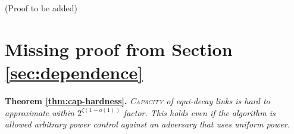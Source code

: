 \documentclass[11pt]{amsart}
\newcommand{\prob}[1]{\textsc{#1}}
\begin{document}
(Proof to be added)
\fi



\iffalse We have proposed a model that captures spatial variability of wireless signals.
The approach is generic enough that most algorithmic techniques for the geometric SINR model carry over with minimal adaptation. 

There are three immediate open questions that our results raise:
Can we further reduce the gap in the approximation in terms of the smoothness parameter? Can we extend our approach to the case, commonly required by distributed algorithms, where we need a \emph{lower} bound on decay and smoothness?
And, can we extend the graph-based approach we applied to connectivity to Steiner-problems or directed graphs?

It is also important to point out that our model does not attempt to cover all the challenging aspects of wireless networks. For one, it is \emph{static} and does not capture dynamicity or temporal variability; this is a very challenging but important aspect. And second, it is \emph{deterministic}; success or failure in wireless networks does have a probabilistic aspect. The work of \cite{Dams2012} suggests that deterministic approximation algorithms perform well if probabilities are independent on a wide scale; the challenge is in modeling the likely dependence, both spatially and temporally. Handling these issues is an interesting and challenging open research direction. 
\fi

\newpage




\appendix

\section{Missing proof from Section \ref{sec:dependence}}

\noindent \textbf{Theorem \ref{thm:cap-hardness}.} \emph{
\prob{Capacity} of equi-decay links is hard to approximate within $2^{\zeta(1-o(1))}$ factor.
This holds even if the algorithm is allowed 
arbitrary power control against an adversary that uses uniform power.
}
\end{document}
